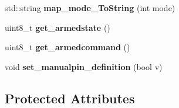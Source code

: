 \begin{DoxyCompactItemize}
std\+::string {\bfseries map\+\_\+mode\+\_\+\+To\+String} (int mode)
\item 
\mbox{\label{classGPIONodeProcess_a38b009ac694c2d7e33e900b1d43a613b}} 
uint8\+\_\+t {\bfseries get\+\_\+armedstate} ()
\item 
\mbox{\label{classGPIONodeProcess_a68fc37f6ff753b208ba4502c4eed1cfb}} 
uint8\+\_\+t {\bfseries get\+\_\+armedcommand} ()
\item 
\mbox{\label{classGPIONodeProcess_a20d4226920dc7b09dd96d2bce0685cf1}} 
void {\bfseries set\+\_\+manualpin\+\_\+definition} (bool v)
\end{DoxyCompactItemize}
\subsection*{Protected Attributes}
